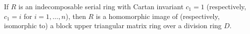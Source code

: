 If $R$ is an indecomposable serial ring with Cartan invariant $c_1 = 1$ (respectively, $c_1 = i$ for $i = 1, \ldots, n$), then $R$ is a homomorphic image of (respectively, isomorphic to) a block upper triangular matrix ring over a division ring $D$.
